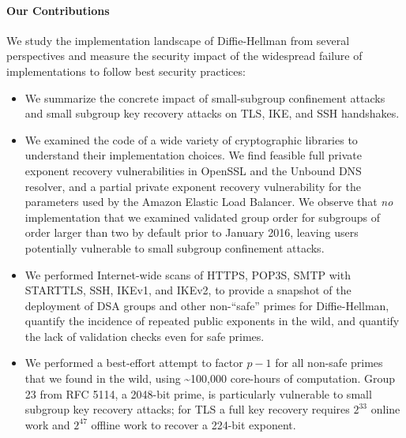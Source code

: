 \paragraph{Our Contributions}
We study the implementation landscape of Diffie-Hellman from several
perspectives and measure the security impact of the widespread 
failure of implementations to follow best security practices:
\begin{itemize}[leftmargin=12pt]
\item We summarize the concrete impact of small-subgroup confinement attacks
    and small subgroup key recovery attacks on TLS, IKE, and SSH handshakes.  
\item We examined the code of a wide variety of cryptographic libraries to
  understand their implementation choices. We find feasible full private
  exponent recovery vulnerabilities in OpenSSL and the Unbound DNS resolver,
  and a partial private exponent recovery vulnerability for the parameters used
  by the Amazon Elastic Load Balancer. We observe that \emph{no} implementation
  that we examined validated group order for subgroups of order larger than two
  by default prior to January 2016, leaving users potentially vulnerable to
  small subgroup confinement attacks.
\item We performed Internet-wide scans of HTTPS, POP3S, SMTP with STARTTLS,
  SSH, IKEv1, and IKEv2, to provide a snapshot of the deployment of DSA groups
  and other non-``safe'' primes for Diffie-Hellman, quantify the incidence of
  repeated public exponents in the wild, and quantify the lack of validation
  checks even for safe primes.
\item We performed a best-effort attempt to factor $p-1$ for all non-safe primes that we found in the
    wild, using \textasciitilde100,000 core-hours
    of computation. Group 23 from RFC 5114, a 2048-bit prime, is particularly vulnerable
    to small subgroup key recovery attacks; for TLS a full key recovery
    requires $2^{33}$ online work and $2^{47}$ offline work to recover a
    224-bit exponent.
\end{itemize}

